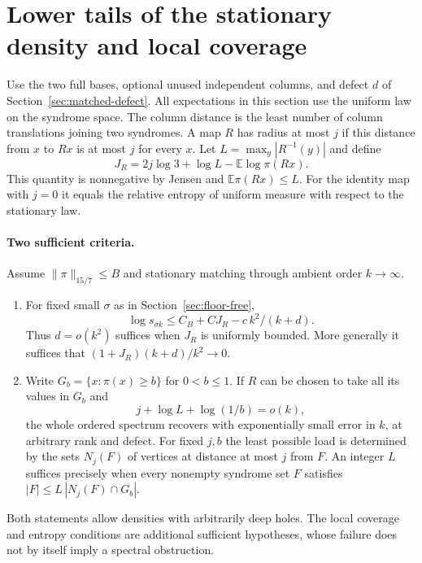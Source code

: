 \section{Lower tails of the stationary density and local coverage}
\label{sec:coverage}
Use the two full bases, optional unused independent columns, and defect $d$ of Section~\ref{sec:matched-defect}. All expectations in this section use the uniform law on the syndrome space. The column distance is the least number of column translations joining two syndromes. A map $R$ has radius at most $j$ if this distance from $x$ to $Rx$ is at most $j$ for every $x$. Let $L=\max_y|R^{-1}(y)|$ and define
\[
 J_R=2j\log3+\log L-\mathbb E\log\pi(Rx).
\]
This quantity is nonnegative by Jensen and $\mathbb E\pi(Rx)\le L$. For the identity map with $j=0$ it equals the relative entropy of uniform measure with respect to the stationary law.

\paragraph{Two sufficient criteria.} Assume $\|\pi\|_{15/7}\le B$ and stationary matching through ambient order $k\to\infty$.
\begin{enumerate}
\item For fixed small $\sigma$ as in Section~\ref{sec:floor-free},
\[
 \log s_{\sigma k}\le C_B+C J_R-c\,k^2/(k+d).                 \tag{C1}
\]
Thus $d=o(k^2)$ suffices when $J_R$ is uniformly bounded. More generally it suffices that $(1+J_R)(k+d)/k^2\to0$.
\item Write $G_b=\{x:\pi(x)\ge b\}$ for $0<b\le1$. If $R$ can be chosen to take all its values in $G_b$ and
\[
  j+\log L+\log(1/b)=o(k),                                   \tag{C2}
\]
the whole ordered spectrum recovers with exponentially small error in $k$, at arbitrary rank and defect. For fixed $j,b$ the least possible load is determined by the sets $N_j(F)$ of vertices at distance at most $j$ from $F$. An integer $L$ suffices precisely when every nonempty syndrome set $F$ satisfies $|F|\le L\,|N_j(F)\cap G_b|$.
\end{enumerate}
Both statements allow densities with arbitrarily deep holes. The local coverage and entropy conditions are additional sufficient hypotheses, whose failure does not by itself imply a spectral obstruction.

